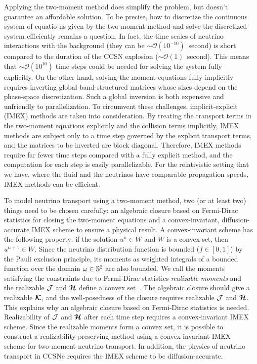 Applying the two-moment method does simplify the problem, but doesn't guarantee an affordable solution.
To be precise, how to discretize the continuous system of equatio
ns given by the two-moment method and solve the discretized system efficiently remains a question.
In fact, the time scales of neutrino interactions with the background (they can be $\sim\mathcal{O}(10^{-10})$~second) is short compared to the duration of the CCSN explosion ($\sim\mathcal{O}(1)$~second).  
This means that $\sim\mathcal{O}(10^{10})$ time steps could be needed for solving the system fully explicitly. 
On the other hand, solving the moment equations fully implicitly requires inverting global band-structured matrices whose sizes depend on the phase-space discretization.
Such a global inversion is both expensive and unfriendly to parallelization.
To circumvent these challenges, implicit-explicit (IMEX) methods are taken into consideration.
By treating the transport terms in the two-moment equations explicitly and the collision terms implicitly, IMEX methods are subject only to a time step governed by the explicit transport terms, and the matrices to be inverted are block diagonal.
Therefore, IMEX methods require far fewer time steps compared with a fully explicit method, and the computation for each step is easily parallelizable.
For the relativistic setting that we have, where the fluid and the neutrinos have comparable propagation speeds, IMEX methods can be efficient.

To model neutrino transport using a two-moment method, two (or at least two) things need to be chosen carefully: an algebraic closure based on Fermi-Dirac statistics for closing the two-moment equations and a convex-invariant, diffusion-accurate IMEX scheme to ensure a physical result.
A convex-invariant scheme has the following property: if the solution $u^{n}\in W$ and $W$ is a convex set, then $u^{n+1}\in W$.
Since the neutrino distribution function is bounded ($f\in[0,1]$) by the Pauli exclusion principle, its moments as weighted integrals of a bounded function over the domain $\omega\in\mathbb{S}^{2}$ are also bounded.
We call the moments satisfying the constraints due to Fermi-Dirac statistics \textit{realizable moments} and the realizable $\mathcal{J}$ and $\boldsymbol{\mathcal{H}}$ define a convex set~\cite{chu_etal_2018}.
The algebraic closure should give a realizable $\boldsymbol{\mathcal{K}}$, and the well-posedness of the closure requires realizable $\mathcal{J}$ and $\boldsymbol{\mathcal{H}}$.
This explains why an algebraic closure based on Fermi-Dirac statistics is needed.
Realizability of $\mathcal{J}$ and $\boldsymbol{\mathcal{H}}$ after each time step requires a convex-invariant IMEX scheme.
Since the realizable moments form a convex set, it is possible to construct a realizability-preserving method using a convex-invariant IMEX scheme for two-moment neutrino transport.
In addition, the physics of neutrino transport in CCSNe requires the IMEX scheme to be diffusion-accurate.

